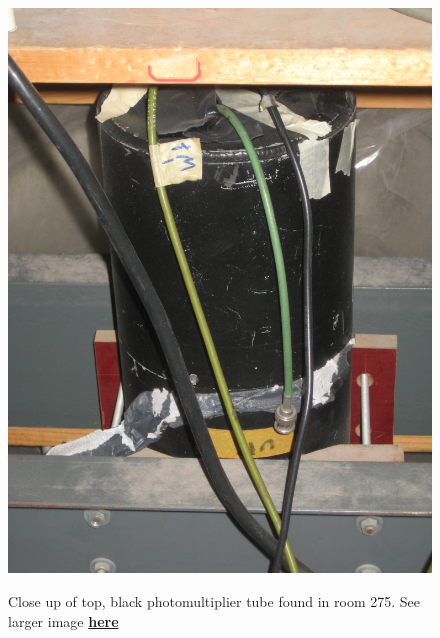 \documentclass{../lab}
\begin{document}
\begin{figure}[h]
\begin{minipage}{0.24\textwidth}
    \href{http://experimentationlab.berkeley.edu/sites/default/files/images/MUO_PMT_3563.jpg}{\includegraphics[width=\linewidth,keepaspectratio]{images/MUO_PMT_3563.jpg}}
    \caption{Close up of top, black photomultiplier tube found in room 275. See larger image \href{http://experimentationlab.berkeley.edu/sites/default/files/images/MUO_PMT_3563.jpg}{\textbf{here}}}
\end{minipage}
\begin{minipage}{0.24\textwidth}

\end{minipage}
\end{figure}
\end{document}
